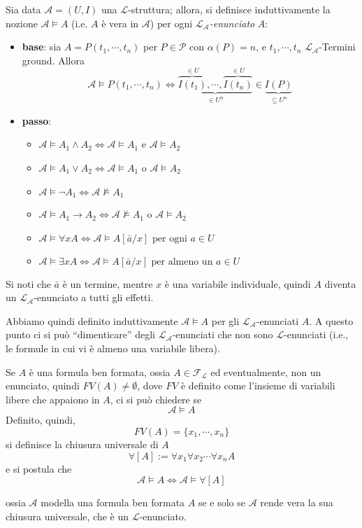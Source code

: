 \begin{defi}
Sia data $\mathscr{A} = (U,I)$ una $\mathscr{L}$-struttura; allora, si definisce induttivamente la nozione $\mathscr{A} \models A$ (i.e. $A$ è vera in $\mathscr{A}$) per ogni $\mathscr{L}_{\mathscr{A}}$\textit{-enunciato} $A$:
\begin{itemize}
  \item \textbf{base}: sia $A = P(t_1, \cdots, t_n)$ per $P \in \mathscr{P}$ con $\alpha(P) = n$, e $t_1, \cdots, t_n$ $\mathscr{L}_{\mathscr{A}}$-Termini ground. Allora
  $$
  \mathscr{A} \models P(t_1, \cdots, t_n) \iff \underbrace{\overbrace{I(t_1)}^{\in U}, \cdots, \overbrace{I(t_n)}^{\in U}}_{\in U^n} \in \underbrace{I(P)}_{\subseteq U^n}
  $$
  \item \textbf{passo}:
    \begin{itemize}
      \item $\mathscr{A} \models A_1 \land A_2 \iff \mathscr{A} \models A_1$ e $\mathscr{A} \models A_2$
      \item $\mathscr{A} \models A_1 \lor A_2 \iff \mathscr{A} \models A_1$ o $\mathscr{A} \models A_2$
      \item $\mathscr{A} \models \neg A_1  \iff \mathscr{A} \nvDash A_1 $
      \item $\mathscr{A} \models A_1 \rightarrow A_2 \iff \mathscr{A} \nvDash A_1$ o $\mathscr{A} \models A_2$
      \item $\mathscr{A} \models\forall x A \iff \mathscr{A} \models A[\bar{a}/x] \text{ per ogni } a \in U$
      \item $\mathscr{A} \models\exists x A \iff \mathscr{A} \models A[\bar{a}/x] \text{ per almeno un } a \in U$
    \end{itemize}
\end{itemize}
\noindent
Si noti che $\bar{a}$ è un termine, mentre $x$ è una variabile individuale, quindi $A$ diventa un $\mathscr{L}_{\mathscr{A}}$-enunciato a tutti gli effetti.
\end{defi}

Abbiamo quindi definito induttivamente $\mathscr{A}\models A$ per gli 
$\mathscr{L}_{\mathscr{A}}$-enunciati $A$. A questo punto ci si può ``dimenticare'' degli $\mathscr{L}_{\mathscr{A}}$-enunciati che non sono $\mathscr{L}$-enunciati (i.e., le formule in cui vi è almeno una variabile libera).

\begin{defi}
Se $A$ è una formula ben formata, ossia $A \in \mathscr{F}_\mathscr{L}$ ed eventualmente,
non un enunciato, quindi $FV(A) \neq \emptyset$, dove $FV$ è definito come l'insieme 
di variabili libere che appaiono in $A$, ci si può chiedere se 
$$ 
\mathscr{A} \models A
$$
Definito, quindi, 
$$
FV(A) = \{x_1, \cdots, x_n\} 
$$
si definisce la chiusura universale di $A$ 
$$
\forall[A] := \forall x_1 \forall x_2 \cdots \forall x_n A
$$
e si postula che
$$
\mathscr{A} \models A \iff \mathscr{A} \models \forall[A]
$$
\end{defi}
ossia $\mathscr{A}$ modella una formula ben formata $A$ se e solo se 
$\mathscr{A}$ rende vera la sua chiusura universale, che è un $\mathscr{L}$-enunciato.

